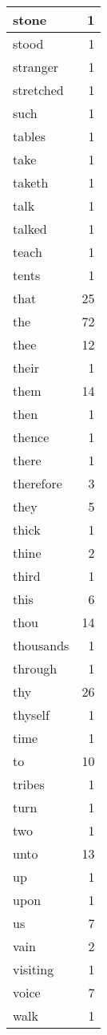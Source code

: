 \begin{center}
\begin{longtable}{l|r}
stone & 1 \\ \hline
stood & 1 \\ \hline
stranger & 1 \\ \hline
stretched & 1 \\ \hline
such & 1 \\ \hline
tables & 1 \\ \hline
take & 1 \\ \hline
taketh & 1 \\ \hline
talk & 1 \\ \hline
talked & 1 \\ \hline
teach & 1 \\ \hline
tents & 1 \\ \hline
that & 25 \\ \hline
the & 72 \\ \hline
thee & 12 \\ \hline
their & 1 \\ \hline
them & 14 \\ \hline
then & 1 \\ \hline
thence & 1 \\ \hline
there & 1 \\ \hline
therefore & 3 \\ \hline
they & 5 \\ \hline
thick & 1 \\ \hline
thine & 2 \\ \hline
third & 1 \\ \hline
this & 6 \\ \hline
thou & 14 \\ \hline
thousands & 1 \\ \hline
through & 1 \\ \hline
thy & 26 \\ \hline
thyself & 1 \\ \hline
time & 1 \\ \hline
to & 10 \\ \hline
tribes & 1 \\ \hline
turn & 1 \\ \hline
two & 1 \\ \hline
unto & 13 \\ \hline
up & 1 \\ \hline
upon & 1 \\ \hline
us & 7 \\ \hline
vain & 2 \\ \hline
visiting & 1 \\ \hline
voice & 7 \\ \hline
walk & 1 \\ \hline

\end{longtable}
\end{center}
